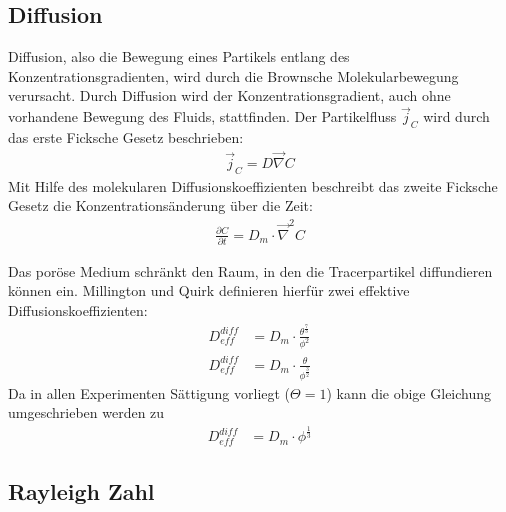 
\subsection{Diffusion}
\label{sec:diff}
Diffusion, also die Bewegung eines Partikels entlang des Konzentrationsgradienten, wird durch die Brownsche Molekularbewegung verursacht. Durch Diffusion wird
der Konzentrationsgradient, auch ohne vorhandene Bewegung des Fluids, stattfinden. Der Partikelfluss $\vec{j}_C$ wird durch das erste Ficksche Gesetz
beschrieben:
\begin{align}
 \vec{j}_C = D \vec{\nabla} C
\end{align}
Mit Hilfe des molekularen Diffusionskoeffizienten beschreibt das zweite Ficksche Gesetz die Konzentrationsänderung über die Zeit:
\begin{align}
 \frac{\partial C}{\partial t} = D_m \cdot \vec{\nabla}^2 C
\end{align}

Das poröse Medium schränkt den Raum, in den die Tracerpartikel diffundieren können ein. Millington und Quirk \citeyearpar{milli-quir} definieren hierfür zwei 
effektive Diffusionskoeffizienten:
\begin{align}
 D_{eff}^{diff} &= D_m \cdot \frac{\theta^{\frac{7}{3}}}{\phi^2} \\
 D_{eff}^{diff} &= D_m \cdot \frac{\theta}{              \phi^\frac{3}{2}}
\end{align}
Da in allen Experimenten Sättigung vorliegt ($\Theta = 1$) kann die obige Gleichung umgeschrieben werden zu
\begin{align}
 D_{eff}^{diff} &= D_m \cdot \phi^{\frac{1}{3}}
\end{align}

\subsection{Rayleigh Zahl}
\label{sec:ray}

